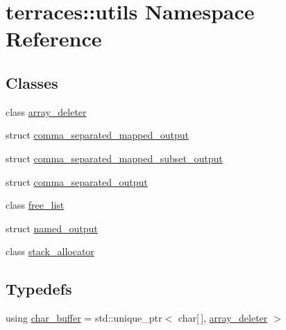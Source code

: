 \hypertarget{namespaceterraces_1_1utils}{}\section{terraces\+:\+:utils Namespace Reference}
\label{namespaceterraces_1_1utils}
\subsection*{Classes}
\begin{DoxyCompactItemize}
\item 
class \hyperlink{classterraces_1_1utils_1_1array__deleter}{array\+\_\+deleter}
\item 
struct \hyperlink{structterraces_1_1utils_1_1comma__separated__mapped__output}{comma\+\_\+separated\+\_\+mapped\+\_\+output}
\item 
struct \hyperlink{structterraces_1_1utils_1_1comma__separated__mapped__subset__output}{comma\+\_\+separated\+\_\+mapped\+\_\+subset\+\_\+output}
\item 
struct \hyperlink{structterraces_1_1utils_1_1comma__separated__output}{comma\+\_\+separated\+\_\+output}
\item 
class \hyperlink{classterraces_1_1utils_1_1free__list}{free\+\_\+list}
\item 
struct \hyperlink{structterraces_1_1utils_1_1named__output}{named\+\_\+output}
\item 
class \hyperlink{classterraces_1_1utils_1_1stack__allocator}{stack\+\_\+allocator}
\end{DoxyCompactItemize}
\subsection*{Typedefs}
\begin{DoxyCompactItemize}
\item 
using \hyperlink{namespaceterraces_1_1utils_a899529841c01a7e7152ac5ef8496c024}{char\+\_\+buffer} = std\+::unique\+\_\+ptr$<$ char\mbox{[}$\,$\mbox{]}, \hyperlink{classterraces_1_1utils_1_1array__deleter}{array\+\_\+deleter} $>$
\end{DoxyCompactItemize}

